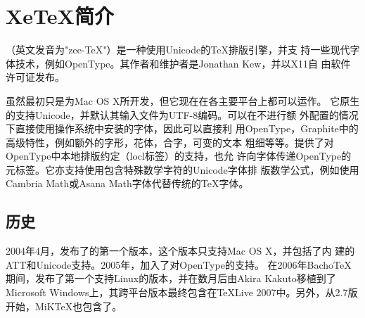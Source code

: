 %
%
%
%
%

\section{XeTeX简介}
\XeTeX{}（英文发音为"zee-\TeX{}"）是一种使用Unicode的\TeX{}排版引擎，并支
持一些现代字体技术，例如OpenType。其作者和维护者是Jonathan Kew，并以X11自
由软件许可证发布。

虽然\XeTeX{}最初只是为Mac OS X所开发，但它现在在各主要平台上都可以运作。
它原生的支持Unicode，并默认其输入文件为UTF-8编码。\XeTeX{}可以在不进行额
外配置的情况下直接使用操作系统中安装的字体，因此可以直接利
用OpenType，Graphite中的高级特性，例如额外的字形，花体，合字，可变的文本
粗细等等。\XeTeX{}提供了对OpenType中本地排版约定（locl标签）的支持，也允
许向字体传递OpenType的元标签。它亦支持使用包含特殊数学字符的Unicode字体排
版数学公式，例如使用Cambria Math或Asana Math字体代替传统的\TeX{}字体。


\subsection{历史}
2004年4月，发布了\XeTeX{}的第一个版本，这个版本只支持Mac OS X，并包括了内
建的ATT和Unicode支持。2005年，加入了对OpenType的支持。
在2006年Bacho\TeX{}期间，发布了第一个支持Linux的版本，并在数月后由Akira
Kakuto移植到了Microsoft Windows上，其跨平台版本最终包含在\TeX{}Live
2007中。另外，从2.7版开始，MiK\TeX{}也包含了\XeTeX{}。

